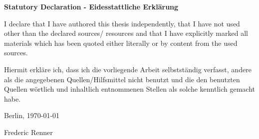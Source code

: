 \begin{center}
    \textbf{Statutory Declaration - Eidesstattliche Erklärung}
\end{center}

I declare that I have authored this thesis independently, that I have not used other than the declared sources/ resources and that I have explicitly marked all materials which has been quoted either literally or by content from the used sources.
\par
Hiermit erkläre ich, dass ich die vorliegende Arbeit selbstständig verfasst, andere als die angegebenen Quellen/Hilfsmittel nicht benutzt und die den benutzten Quellen wörtlich und inhaltlich entnommenen Stellen als solche kenntlich gemacht habe.

\begin{flushright}
\vspace{1.5cm}
Berlin, \today
\vspace{2cm}

\makebox[5cm]{\hrulefill}

Frederic Renner
\end{flushright}